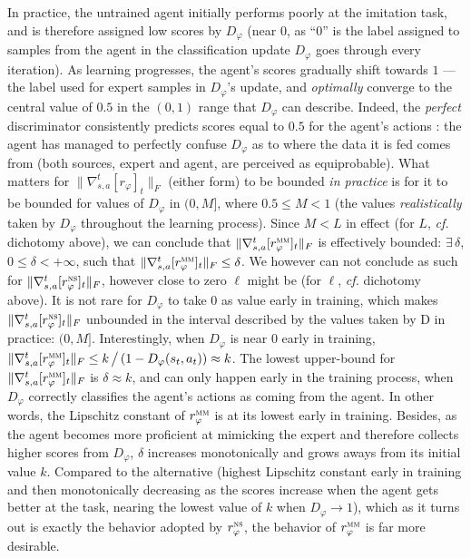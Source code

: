 In practice, the untrained agent initially performs poorly at the imitation task,
and is therefore assigned low scores by $D_\varphi$ (near $0$,
as ``$0$'' is the label assigned to samples from the agent in the classification update $D_\varphi$ goes through
every iteration).
As learning progresses, the agent's scores gradually shift towards $1$
--- the label used for expert samples in $D_\varphi$'s update,
and \emph{optimally} converge to the central value of $0.5$ in the $(0,1)$ range that $D_\varphi$ can describe.
Indeed, the \emph{perfect} discriminator consistently predicts scores equal to $0.5$ for the agent's actions
\cite{Goodfellow2017-pv}: the agent has managed to perfectly confuse $D_\varphi$ as to where the data it is fed
comes from (both sources, expert and agent, are perceived as equiprobable).
What matters for $\lVert \nabla_{s,a}^t[r_\varphi]_t \rVert _F$ (either form) to be bounded \emph{in practice} is
for it to be bounded for values of $D_\varphi$ in $(0,M]$, where $0.5 \leq M < 1$
(the values \emph{realistically} taken by $D_\varphi$ throughout the learning process).
Since $M < L$ in effect (for $L$, \textit{cf.} dichotomy above),
we can conclude that $\lVert \nabla_{s,a}^t[r_\varphi^\textsc{mm}]_t \rVert _F$
is effectively bounded: $\exists \, \delta$, $0 \leq \delta < +\infty$, such that
$\lVert \nabla_{s,a}^t[r_\varphi^\textsc{mm}]_t \rVert _F \leq \delta$.
We however can not conclude as such for $\lVert \nabla_{s,a}^t[r_\varphi^\textsc{ns}]_t \rVert _F$,
however close to zero $\ell$ might be (for $\ell$, \textit{cf.} dichotomy above).
It is not rare for $D_\varphi$ to take $0$ as value early in training,
which makes $\lVert \nabla_{s,a}^t[r_\varphi^\textsc{ns}]_t \rVert _F$ unbounded
in the interval described by the values taken by D in practice: $(0, M]$.
Interestingly, when $D_\varphi$ is near $0$ early in training,
$\lVert \nabla_{s,a}^t[r_\varphi^\textsc{mm}]_t \rVert _F
\leq k \, \big/ \, (1 - D_\varphi(s_t,a_t)) \approx k$.
The lowest upper-bound for $\lVert \nabla_{s,a}^t[r_\varphi^\textsc{mm}]_t \rVert _F$
is $\delta \approx k$, and can only happen early in the training process, when $D_\varphi$ correctly
classifies the agent's actions as coming from the agent.
In other words, the Lipschitz constant of $r_\varphi^\textsc{mm}$ is at its lowest early in training.
Besides, as the agent becomes more proficient at mimicking the expert and therefore collects higher scores
from $D_\varphi$, $\delta$ increases monotonically and grows aways from its initial value $k$.
Compared to the alternative (highest Lipschitz constant early in training and then monotonically decreasing
as the scores increase when the agent gets better at the task, nearing the lowest value of $k$ when
$D_\varphi \to 1$),
which as it turns out is exactly the behavior adopted by $r_\varphi^\textsc{ns}$,
the behavior of $r_\varphi^\textsc{mm}$ is far more desirable.

